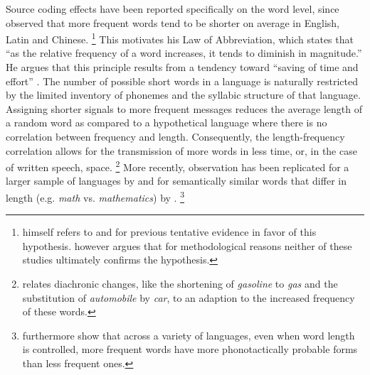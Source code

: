 Source coding effects have been reported specifically on the word level, since \citet{zipf1935} observed that more frequent words tend to be shorter on average in English, Latin and Chinese.%
%
\footnote{\citeauthor{zipf1935} himself refers to \citet{kaeding1897} and \citet{eldridge1911} for previous tentative evidence in favor of this hypothesis. \citet[23--25]{zipf1935} however argues that for methodological reasons neither of these studies ultimately confirms the hypothesis.}\afterfn%
%
This motivates his Law of Abbreviation, which states that ``as the relative frequency of a word increases, it tends to diminish in magnitude.'' He argues that this principle results from a tendency toward ``saving of time and effort'' \citep[38]{zipf1935}. The number of possible short words in a language is naturally restricted by the limited inventory of phonemes and the syllabic structure of that language. Assigning shorter signals to more frequent messages reduces the average length of a random word as compared to a hypothetical language where there is no correlation between frequency and length. Consequently, the length-frequency correlation allows for the transmission of more words in less time, or, in the case of written speech, space.%
%
\footnote{\citet[30--36]{zipf1935} relates diachronic changes, like the shortening of \textit{gasoline} to \textit{gas} and the substitution of \textit{automobile} by \textit{car}, to an adaption to the increased frequency of these words.}\afterfn%
%
More recently,  observation has been replicated for a larger sample of languages by \citet{piantadosi.etal2011} and for semantically similar words that differ in length (e.g. \textit{math} vs. \textit{mathematics}) by \citet{mahowald.etal2013}.%
%
\footnote{\citet{mahowald.etal2018} furthermore show that across a variety of languages, even when word length is controlled, more frequent words have more phonotactically probable forms than less frequent ones.}\afterfn%
%

